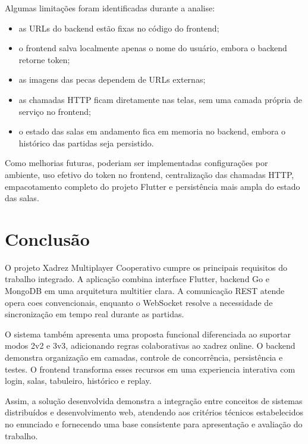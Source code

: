 \documentclass[12pt]{article}
\begin{document}
Algumas limitações foram identificadas durante a analise:

\begin{itemize}
    \item as URLs do backend estão fixas no código do frontend;
    \item o frontend salva localmente apenas o nome do usuário, embora o backend retorne token;
    \item as imagens das pecas dependem de URLs externas;
    \item as chamadas HTTP ficam diretamente nas telas, sem uma camada própria de serviço no frontend;
    \item o estado das salas em andamento fica em memoria no backend, embora o histórico das partidas seja persistido.
\end{itemize}

Como melhorias futuras, poderiam ser implementadas configurações por ambiente, uso efetivo do token no frontend, centralização das chamadas HTTP, empacotamento completo do projeto Flutter e persistência mais ampla do estado das salas.

\section{Conclusão}

O projeto Xadrez Multiplayer Cooperativo cumpre os principais requisitos do trabalho integrado. A aplicação combina interface Flutter, backend Go e MongoDB em uma arquitetura multitier clara. A comunicação REST atende opera coes convencionais, enquanto o WebSocket resolve a necessidade de sincronização em tempo real durante as partidas.

O sistema também apresenta uma proposta funcional diferenciada ao suportar modos 2v2 e 3v3, adicionando regras colaborativas ao xadrez online. O backend demonstra organização em camadas, controle de concorrência, persistência e testes. O frontend transforma esses recursos em uma experiencia interativa com login, salas, tabuleiro, histórico e replay.

Assim, a solução desenvolvida demonstra a integração entre conceitos de sistemas distribuídos e desenvolvimento web, atendendo aos critérios técnicos estabelecidos no enunciado e fornecendo uma base consistente para apresentação e avaliação do trabalho.
\end{document}
